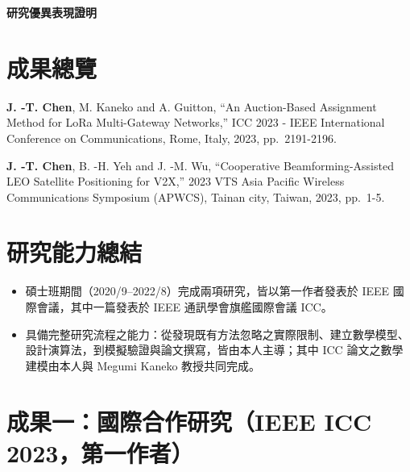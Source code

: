 \documentclass[11pt,fontset=none]{ctexart}
\begin{document}
\begin{center}
  {\Large\bfseries 研究優異表現證明\par}
\end{center}

\section{成果總覽}

\begin{enumerate}[label={[\arabic*]}, leftmargin=2.2em]
  \item \textbf{J. -T. Chen}, M. Kaneko and A. Guitton, ``An Auction-Based
    Assignment Method for LoRa Multi-Gateway Networks,'' ICC 2023 - IEEE
    International Conference on Communications, Rome, Italy, 2023,
    pp.~2191-2196.
  \item \textbf{J. -T. Chen}, B. -H. Yeh and J. -M. Wu, ``Cooperative
    Beamforming-Assisted LEO Satellite Positioning for V2X,'' 2023 VTS Asia
    Pacific Wireless Communications Symposium (APWCS), Tainan city, Taiwan,
    2023, pp.~1-5.
\end{enumerate}

\section{研究能力總結}

\begin{itemize}
  \item 碩士班期間（2020/9--2022/8）完成兩項研究，皆以第一作者發表於 IEEE 國際會議，其中一篇發表於 IEEE 通訊學會旗艦國際會議 ICC。
  \item 具備完整研究流程之能力：從發現既有方法忽略之實際限制、建立數學模型、設計演算法，到模擬驗證與論文撰寫，皆由本人主導；其中 ICC 論文之數學建模由本人與 Megumi Kaneko 教授共同完成。
\end{itemize}

\section{成果一：國際合作研究（IEEE ICC 2023，第一作者）}
\end{document}
